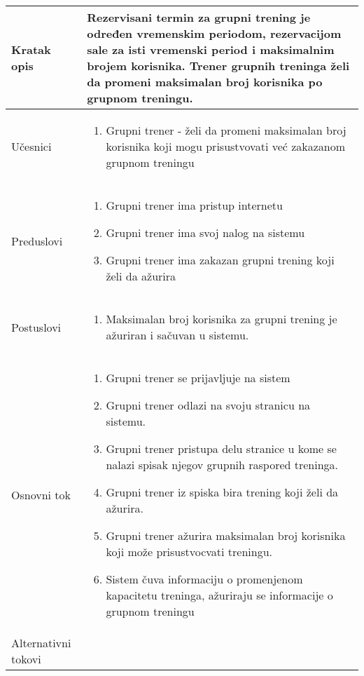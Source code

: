 \documentclass[../grupniTreninzi.tex]{subfiles}
\begin{document}
\begin{longtable}{| p{} | p{} |} 
\hline
    Kratak opis &  Rezervisani termin za grupni trening je određen vremenskim periodom, rezervacijom sale za isti vremenski period i maksimalnim brojem korisnika. Trener grupnih treninga želi da promeni maksimalan broj korisnika po grupnom treningu.\\ 
\hline    
    Učesnici &
    \begin{enumerate}
        \item Grupni trener - želi da promeni maksimalan broj korisnika koji mogu prisustvovati već zakazanom grupnom treningu
    \end{enumerate}\\
\hline
   Preduslovi & 
   \begin{enumerate}
        \item Grupni trener ima pristup internetu
        \item Grupni trener ima svoj nalog na sistemu
        \item Grupni trener ima zakazan grupni trening koji želi da ažurira
    \end{enumerate}\\
\hline  
    Postuslovi &
    \begin{enumerate}
        \item Maksimalan broj korisnika za grupni trening je ažuriran i sačuvan u sistemu.
    \end{enumerate}\\
\hline
    Osnovni tok & 
    \begin{enumerate}
        \item Grupni trener se prijavljuje na sistem
        \item Grupni trener odlazi na svoju stranicu na sistemu.
        \item Grupni trener pristupa delu stranice u kome se nalazi spisak njegov grupnih raspored treninga.
        \item Grupni trener iz spiska bira trening koji želi da ažurira.
        \item Grupni trener ažurira maksimalan broj korisnika koji može prisustvocvati treningu.
        \item Sistem čuva informaciju o promenjenom kapacitetu treninga, ažuriraju se informacije o grupnom treningu 
    \end{enumerate}\\
\hline
    Alternativni tokovi & 
       \begin{enumerate}

\end{enumerate}
\end{longtable}
\end{document}
